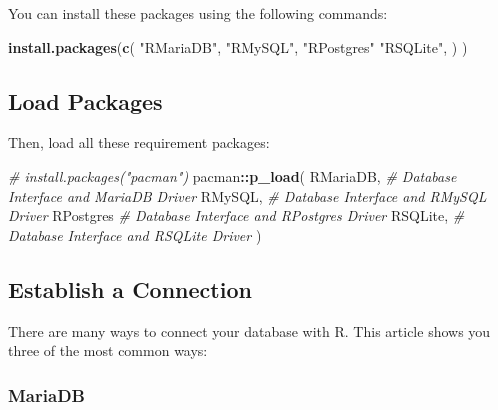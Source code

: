 \documentclass[
]{book}
\newenvironment{Shaded}{\begin{snugshade}}{\end{snugshade}}
\newcommand{\CommentTok}[1]{\textcolor[rgb]{0.56,0.35,0.01}{\textit{#1}}}
\newcommand{\FunctionTok}[1]{\textcolor[rgb]{0.13,0.29,0.53}{\textbf{#1}}}
\newcommand{\NormalTok}[1]{#1}
\newcommand{\SpecialCharTok}[1]{\textcolor[rgb]{0.81,0.36,0.00}{\textbf{#1}}}
\newcommand{\StringTok}[1]{\textcolor[rgb]{0.31,0.60,0.02}{#1}}
\begin{document}
You can install these packages using the following commands:

\begin{Shaded}
\begin{Highlighting}[]
\FunctionTok{install.packages}\NormalTok{(}\FunctionTok{c}\NormalTok{(}
                   \StringTok{"RMariaDB"}\NormalTok{,}
                   \StringTok{"RMySQL"}\NormalTok{,}
                   \StringTok{"RPostgres"}
                   \StringTok{"RSQLite"}\NormalTok{,}
\NormalTok{                   )}
\NormalTok{                 )}
\end{Highlighting}
\end{Shaded}

\hypertarget{load-packages}{%
\subsection{Load Packages}\label{load-packages}}

Then, load all these requirement packages:

\begin{Shaded}
\begin{Highlighting}[]
\CommentTok{\# install.packages("pacman")}
\NormalTok{pacman}\SpecialCharTok{::}\FunctionTok{p\_load}\NormalTok{(}
\NormalTok{               RMariaDB,             }\CommentTok{\# Database Interface and \textquotesingle{}MariaDB\textquotesingle{} Driver}
\NormalTok{               RMySQL,               }\CommentTok{\# Database Interface and \textquotesingle{}RMySQL\textquotesingle{} Driver}
\NormalTok{               RPostgres             }\CommentTok{\# Database Interface and \textquotesingle{}RPostgres\textquotesingle{} Driver}
\NormalTok{               RSQLite,              }\CommentTok{\# Database Interface and \textquotesingle{}RSQLite\textquotesingle{} Driver}
\NormalTok{          )}
\end{Highlighting}
\end{Shaded}

\hypertarget{establish-a-connection}{%
\subsection{Establish a Connection}\label{establish-a-connection}}

There are many ways to connect your database with R. This article shows you three of the most common ways:

\hypertarget{mariadb}{%
\subsubsection*{MariaDB}\label{mariadb}}
\end{document}
